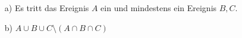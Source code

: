 \begin{enumerate}
	\item[a)] Es tritt das Ereignis $A$ ein und mindestens ein Ereignis $B,C$.
	\item[b)] $A\cup B\cup C \setminus (A\cap B\cap C)$
\end{enumerate}
